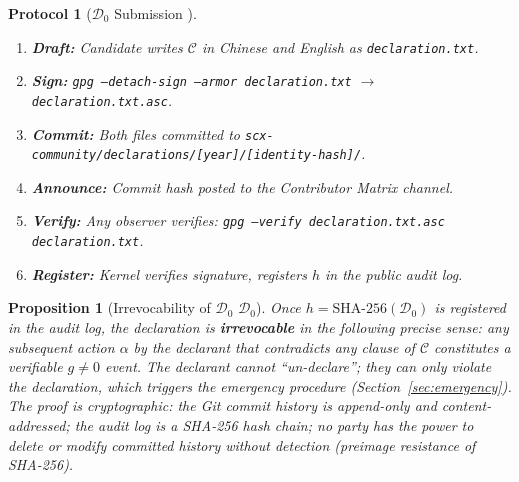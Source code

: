 \documentclass[12pt,a4paper]{article}
\newtheorem{proposition}[theorem]{Proposition}
\newtheorem{protocol}[theorem]{Protocol}
\theoremstyle{definition}
\newcommand{\gnonzero}{g \neq 0}
\newcommand{\GzeroDecl}{\mathcal{D}_{0}}
\begin{document}
\begin{protocol}[$\GzeroDecl$ Submission ]
\label{prot:gzero_submit}
\begin{enumerate}[label=\textbf{Step \arabic*},leftmargin=*]
    \item \textbf{Draft:} Candidate writes $\mathcal{C}$ in Chinese and English as \texttt{declaration.txt}.
    \item \textbf{Sign:} \texttt{gpg --detach-sign --armor declaration.txt} $\to$ \texttt{declaration.txt.asc}.
    \item \textbf{Commit:} Both files committed to \texttt{scx-community/declarations/[year]/[identity-hash]/}.
    \item \textbf{Announce:} Commit hash posted to the Contributor Matrix channel.
    \item \textbf{Verify:} Any observer verifies: \texttt{gpg --verify declaration.txt.asc declaration.txt}.
    \item \textbf{Register:} Kernel verifies signature, registers $h$ in the public audit log.
\end{enumerate}
\end{protocol}
\begin{proposition}[Irrevocability of $\GzeroDecl$ $\GzeroDecl$]
\label{prop:irrevocability}
Once $h = \text{SHA-256}(\GzeroDecl)$ is registered in the audit log, the declaration is \textbf{irrevocable} in the following precise sense: any subsequent action $\alpha$ by the declarant that contradicts any clause of $\mathcal{C}$ constitutes a verifiable $\gnonzero$ event. The declarant cannot ``un-declare''; they can only violate the declaration, which triggers the emergency procedure (Section~\ref{sec:emergency}). The proof is cryptographic: the Git commit history is append-only and content-addressed; the audit log is a SHA-256 hash chain; no party has the power to delete or modify committed history without detection (preimage resistance of SHA-256).
\end{proposition}
\end{document}
